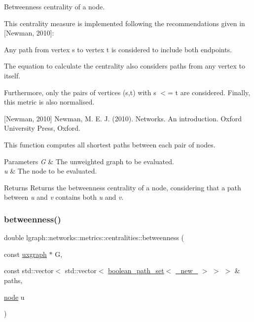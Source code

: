 Betweenness centrality of a node. 

This centrality measure is implemented following the recommendations given in \mbox{[}Newman, 2010\mbox{]}\+:
\begin{DoxyItemize}
\item Any path from vertex \textquotesingle{}s\textquotesingle{} to vertex \textquotesingle{}t\textquotesingle{} is considered to include both endpoints.
\item The equation to calculate the centrality also considers paths from any vertex to itself.
\end{DoxyItemize}

Furthermore, only the pairs of vertices (s,t) with s $<$= t are considered. Finally, this metric is also normalised.

\mbox{[}Newman, 2010\mbox{]} Newman, M. E. J. (2010). Networks. An introduction. Oxford University Press, Oxford.

This function computes all shortest paths between each pair of nodes.


\begin{DoxyParams}{Parameters}
{\em G} & The unweighted graph to be evaluated. \\
\hline
{\em u} & The node to be evaluated. \\
\hline
\end{DoxyParams}
\begin{DoxyReturn}{Returns}
Returns the betweenness centrality of a node, considering that a path between {\itshape u} and {\itshape v} contains both {\itshape u} and {\itshape v}. 
\end{DoxyReturn}
\mbox{\label{namespacelgraph_1_1networks_1_1metrics_1_1centralities_a9c5f210ed96ff6bcb1dfb45aaba3f947}} 
\subsubsection{\texorpdfstring{betweenness()}{betweenness()}\hspace{0.1cm}{\footnotesize\ttfamily [4/8]}}
{\footnotesize\ttfamily double lgraph\+::networks\+::metrics\+::centralities\+::betweenness (\begin{DoxyParamCaption}\item[{const \hyperlink{classlgraph_1_1uxgraph}{uxgraph} $\ast$}]{G,  }\item[{const std\+::vector$<$ std\+::vector$<$ \hyperlink{namespacelgraph_afad432931ba600ab1628d5c9595986c5}{boolean\+\_\+path\+\_\+set}$<$ \hyperlink{namespacelgraph_aa930092705699c3af78e3a4de7880a3f}{\+\_\+new\+\_\+} $>$ $>$ $>$ \&}]{paths,  }\item[{\hyperlink{namespacelgraph_a397169dd66adf725210a30fb7251773e}{node}}]{u }\end{DoxyParamCaption})}



